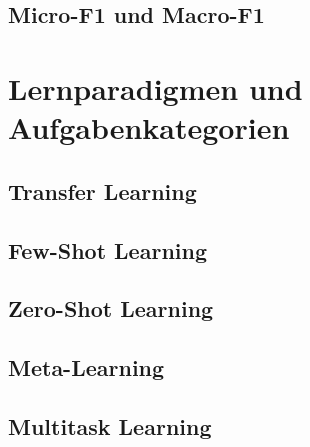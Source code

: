\subsection{Micro-F1 und Macro-F1}
\label{subsec:micro-macro-f1}

\section{Lernparadigmen und Aufgabenkategorien}
\label{sec:lernparadigmen-aufgabenkategorien}

\subsection{Transfer Learning}
\label{subsec:transfer-learning}

\subsection{Few-Shot Learning}
\label{subsec:few-shot-learning}

\subsection{Zero-Shot Learning}
\label{subsec:zero-shot-learning}

\subsection{Meta-Learning}
\label{subsec:meta-learning}

\subsection{Multitask Learning}
\label{subsec:multitask-learning}
